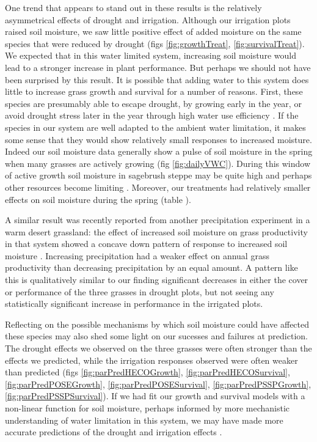 \documentclass[11pt]{article}
\begin{document}
\begin{doublespacing}
One trend that appears to stand out in these results is the relatively asymmetrical effects of drought and irrigation. Although our irrigation plots raised soil moisture, we saw little positive effect of added moisture on the same species that were reduced by drought (figs \ref{fig:growthTreat}, \ref{fig:survivalTreat}). We expected that in this water limited system, increasing soil moisture would lead to a stronger increase in plant performance. But perhaps we should not have been surprised by this result. It is possible that adding water to this system does little to increase grass growth and survival for a number of reasons.  First, these species are presumably able to escape drought, by growing early in the year, or avoid drought stress later in the year through high water use efficiency \citep{bazzaz_physiological_1979,franks_plasticity_2011}. If the species in our system are well adapted to the ambient water limitation, it makes some sense that they would show relatively small responses to increased moisture. Indeed our soil moisture data generally show a pulse of soil moisture in the spring when many grasses are actively growing (fig \ref{fig:dailyVWC}). During this window of active growth soil moisture in sagebrush steppe may be quite high and perhaps other resources become limiting \citep{caldwell_rapid_1987}. Moreover, our treatments had relatively smaller effects on soil moisture during the spring (table ). 

A similar result was recently reported from another precipitation experiment in a warm desert grassland: the effect of increased soil moisture on grass productivity in that system showed a concave down pattern of response to increased soil moisture \citep{gherardi_enhanced_2015}.  Increasing precipitation had a weaker effect on annual grass productivity than decreasing precipitation by an equal amount. A pattern like this is qualitatively similar to our finding significant decreases in either the cover or performance of the three grasses in drought plots, but not seeing any statistically significant increase in performance in the irrigated plots.  

Reflecting on the possible mechanisms by which soil moisture could have affected these species may also shed some light on our sucesses and failures at prediction. The drought effects we observed on the three grasses were often stronger than the effects we predicted, while the irrigation responses observed were often weaker than predicted (figs \ref{fig:parPredHECOGrowth}, \ref{fig:parPredHECOSurvival}, \ref{fig:parPredPOSEGrowth}, \ref{fig:parPredPOSESurvival}, \ref{fig:parPredPSSPGrowth}, \ref{fig:parPredPSSPSurvival}). If we had fit our growth and survival models with a non-linear function for soil moisture, perhaps informed by more mechanistic understanding of water limitation in this system, we may have made more accurate predictions of the drought and irrigation effects \citep{ehrlen_advancing_2016}.


\end{doublespacing}
\end{document}
